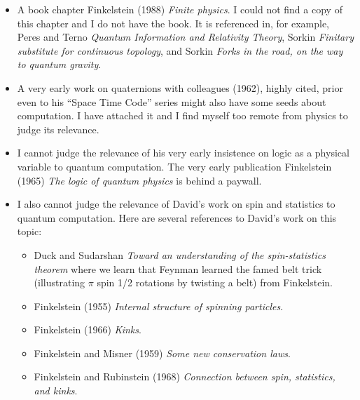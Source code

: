 \begin{description}
\begin{itemize}
{here}
or Rickles (2017) {\em David Finkelstein interview} in the
memorial issue of IJTP.
   \item	
A book chapter Finkelstein (1988) {\em Finite physics}. I
could not find a copy of this chapter and I do not have the book.
It is referenced in, for example,
Peres and Terno {\em Quantum Information and Relativity Theory},
Sorkin {\em Finitary substitute for continuous topology},
and
Sorkin
{\em Forks in the road, on the way to quantum gravity}.
   \item	
A very early work on quaternions with colleagues (1962), highly cited,
prior even to his ``Space Time Code'' series might also have some seeds
about computation. I have attached it and I find myself too remote from
physics to judge its relevance.
   \item	
I cannot judge the relevance of his very early insistence on logic as a
physical variable to quantum computation. The very early publication
Finkelstein (1965)
{\em The logic of quantum physics}
is behind a paywall.
   \item	
I also cannot judge the relevance of David's work on spin and statistics
to quantum computation. Here are several references to David's work on
this topic:
\begin{itemize}
   \item	
Duck and Sudarshan
{\em Toward an understanding of the spin-statistics theorem}
where we learn that Feynman learned the famed belt trick (illustrating
$\pi$ spin 1/2 rotations by twisting a belt) from
Finkelstein.
   \item	
Finkelstein (1955)
{\em Internal structure of spinning particles}.
   \item	
Finkelstein (1966) {\em Kinks}.
   \item	
Finkelstein and Misner (1959)
{\em Some new conservation laws}.
   \item	
Finkelstein and Rubinstein (1968)
{\em Connection between spin, statistics, and kinks}.
    \end{itemize}
\end{itemize}



\end{description}

